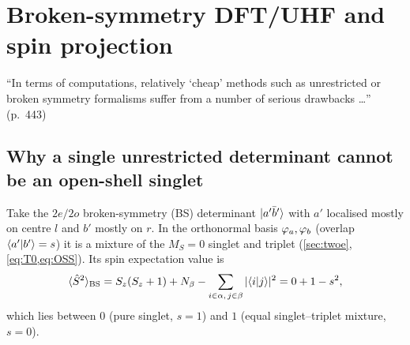 \section{Broken-symmetry DFT/UHF and spin projection}\label{sec:bs}

\begin{reviewclaim}
``In terms of computations, relatively `cheap' methods such as unrestricted or broken symmetry formalisms
suffer from a number of serious drawbacks \dots'' (p.~443)
\end{reviewclaim}

\subsection{Why a single unrestricted determinant cannot be an open-shell singlet}
Take the $2e/2o$ broken-symmetry (BS) determinant $\lvert a'\bar b'\rangle$ with $a'$ localised mostly on centre $l$ and
$b'$ mostly on $r$. In the orthonormal basis $\varphi_a,\varphi_b$ (overlap $\langle a'\vert b'\rangle=s$) it is a mixture of the
$M_S=0$ singlet and triplet (\cref{sec:twoe}, \cref{eq:T0,eq:OSS}). Its spin expectation value is
\begin{equation}
  \langle \hat S^2\rangle_{\text{BS}}=S_z(S_z+1)+N_\beta-\sum_{i\in\alpha,\,j\in\beta}|\langle i\vert j\rangle|^2=0+1-s^2,
\end{equation}
which lies between $0$ (pure singlet, $s=1$) and $1$ (equal singlet--triplet mixture, $s=0$).

